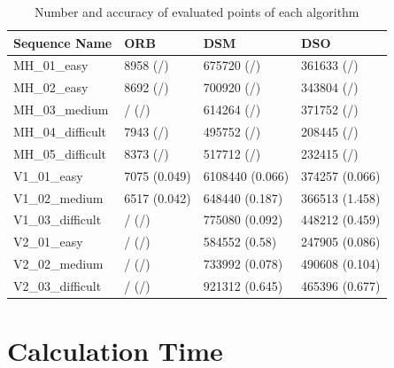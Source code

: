 	
	\begin{table}
	\caption{Number and accuracy of evaluated points of each algorithm}
	\begin{tabular}{ |p{3cm}||p{3cm}|p{3cm}|p{3cm}|  }
	\hline
	Sequence Name& ORB & DSM & DSO \\
	\hline
	MH\_01\_easy & 8958 (/) & 675720 (/) & 361633 (/)\\
	MH\_02\_easy & 8692 (/) & 700920 (/) & 343804 (/)\\
	MH\_03\_medium & / (/) & 614264 (/) & 371752 (/)\\
	MH\_04\_difficult & 7943 (/) & 495752 (/) & 208445 (/)\\
	MH\_05\_difficult & 8373 (/) & 517712 (/) & 232415 (/)\\
	V1\_01\_easy & 7075 (0.049) & 6108440 (0.066) & 374257 (0.066)\\
	V1\_02\_medium & 6517 (0.042) & 648440 (0.187) & 366513 (1.458)\\
	V1\_03\_difficult & / (/) & 775080 (0.092) & 448212 (0.459)\\
	V2\_01\_easy & / (/) & 584552 (0.58) & 247905 (0.086)\\
	V2\_02\_medium & / (/)& 733992 (0.078) & 490608 (0.104)\\
	V2\_03\_difficult & / (/) & 921312 (0.645) & 465396 (0.677)\\
	\hline
	\end{tabular}
	\label{table:pointcloud}
	\end{table}
	
	
	
	

\section{Calculation Time}

